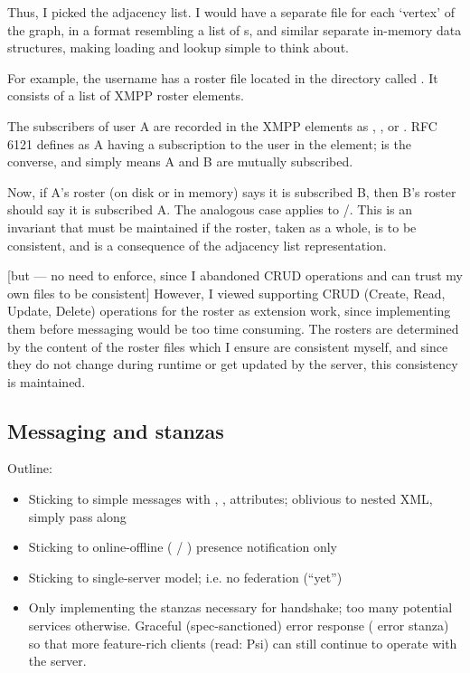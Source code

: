 Thus, I picked the adjacency list. I would have a separate file for each `vertex' of the graph, in a format resembling a list of s, and similar separate in-memory data structures, making loading and lookup simple to think about.

For example, the username  has a roster file located in the  directory called . It consists of a list of XMPP roster  elements.

The subscribers of user A are recorded in the XMPP  elements as , , or . RFC 6121 defines  as A having a subscription to the user in the  element;  is the converse, and  simply means A and B are mutually subscribed.

Now, if A's roster (on disk or in memory) says it is subscribed  B, then B's roster should say it is subscribed  A. The analogous case applies to /. This is an invariant that must be maintained if the roster, taken as a whole, is to be consistent, and is a consequence of the adjacency list representation.

[but --- no need to enforce, since I abandoned CRUD operations and can trust my own files to be consistent]
However, I viewed supporting CRUD (Create, Read, Update, Delete) operations for the roster as extension work, since implementing them before messaging would be too time consuming. The rosters are determined by the content of the roster files which I ensure are consistent myself, and since they do not change during runtime or get updated by the server, this consistency is maintained.

\subsection{Messaging and stanzas}
Outline:
\begin{itemize}
  \item Sticking to simple messages with , ,  attributes; oblivious to nested XML, simply pass along
  \item Sticking to online-offline ( / ) presence notification only
  \item Sticking to single-server model; i.e. no federation (``yet'')
  \item Only implementing the  stanzas necessary for handshake; too many potential services otherwise. Graceful (spec-sanctioned) error response ( error stanza) so that more feature-rich clients (read: Psi) can still continue to operate with the server.
\end{itemize}

